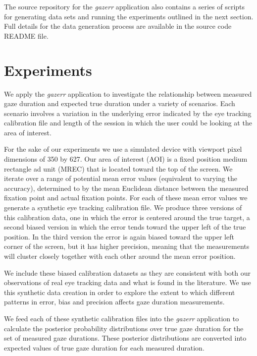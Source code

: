 \documentclass[12pt,a4paper]{article}
\numberwithin{equation}{section}
\begin{document}
The source repository for the \textit{gazerr} application also contains a series of 
scripts for generating data sets and running the experiments outlined in the next 
section. Full details for the data generation process are available in the 
source code README file.

\section{Experiments}

We apply the \textit{gazerr} application to investigate the relationship between 
measured gaze duration and expected true duration under a variety of scenarios. 
Each scenario involves a variation in the underlying error indicated by the eye tracking 
calibration file and length of the session in which the user could be looking at 
the area of interest.

For the sake of our experiments we use a simulated device with viewport pixel 
dimensions of 350 by 627. Our area of interest (AOI) is a fixed position medium 
rectangle ad unit (MREC) that is located toward the top of the screen. 
We iterate over a range of potential mean error values 
(equivalent to varying the accuracy), determined to by the mean Euclidean distance 
between the measured fixation point and actual fixation points.
For each of these mean error values we generate a synthetic eye tracking calibration 
file. We produce three versions of this calibration data, one in which the error 
is centered around the true target, a second biased version in which the error tends 
toward the upper left of the true position. In the third version the error is again
biased toward the upper left corner of the screen, but it has higher precision, 
meaning that the measurements will cluster closely together with each other around
the mean error position.

We include these biased calibration datasets as they are consistent with both our 
observations of real eye tracking data and what is found in the literature\cite{Holmqvist2022}.
We use this synthetic data creation in order to explore the extent to which different
patterns in error, bias and precision affects gaze duration measurements.

We feed each of these synthetic calibration files into the \textit{gazerr} application
to calculate the posterior probability distributions over true gaze duration for 
the set of measured gaze durations. These posterior distributions are converted 
into expected values of true gaze duration for each measured duration.
\end{document}

